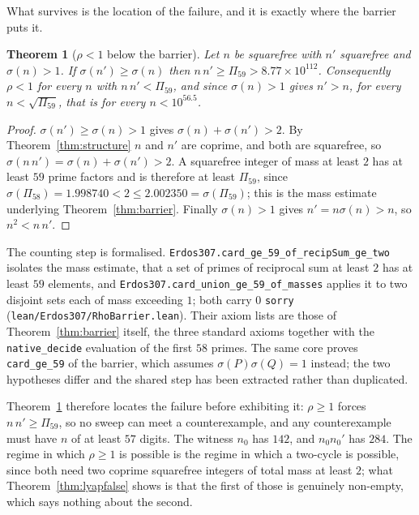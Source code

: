 \documentclass[11pt]{article}
\newtheorem{theorem}{Theorem}[section]
\theoremstyle{definition}
\begin{document}
What survives is the location of the failure, and it is exactly where the barrier puts it.

\begin{theorem}[$\rho<1$ below the barrier]\label{thm:rhobarrier}
Let $n$ be squarefree with $n'$ squarefree and $\sigma(n)>1$. If $\sigma(n')\ge\sigma(n)$ then
$n\,n'\ge\Pi_{59}>8.77\times10^{112}$. Consequently $\rho<1$ for every $n$ with
$n\,n'<\Pi_{59}$, and since $\sigma(n)>1$ gives $n'>n$, for every $n<\sqrt{\Pi_{59}}$, that is for
every $n<10^{56.5}$.
\end{theorem}
\begin{proof}
$\sigma(n')\ge\sigma(n)>1$ gives $\sigma(n)+\sigma(n')>2$. By Theorem~\ref{thm:structure} $n$ and
$n'$ are coprime, and both are squarefree, so $\sigma(n\,n')=\sigma(n)+\sigma(n')>2$. A squarefree
integer of mass at least $2$ has at least $59$ prime factors and is therefore at least $\Pi_{59}$,
since $\sigma(\Pi_{58})=1.998740<2\le2.002350=\sigma(\Pi_{59})$; this is the mass estimate
underlying Theorem~\ref{thm:barrier}. Finally $\sigma(n)>1$ gives $n'=n\sigma(n)>n$, so
$n^2<n\,n'$.
\end{proof}

The counting step is formalised. \texttt{Erdos307.card\_ge\_59\_of\_recipSum\_ge\_two} isolates the
mass estimate, that a set of primes of reciprocal sum at least $2$ has at least $59$ elements, and
\texttt{Erdos307.card\_union\_ge\_59\_of\_masses} applies it to two disjoint sets each of mass
exceeding $1$; both carry $0$ \texttt{sorry}
\textup{(\texttt{lean/Erdos307/RhoBarrier.lean})}. Their axiom lists are those of
Theorem~\ref{thm:barrier} itself, the three standard axioms together with the
\texttt{native\_decide} evaluation of the first $58$ primes. The same core proves
\texttt{card\_ge\_59} of the barrier, which assumes $\sigma(P)\sigma(Q)=1$ instead; the two
hypotheses differ and the shared step has been extracted rather than duplicated.

Theorem~\ref{thm:rhobarrier} therefore locates the failure before exhibiting it: $\rho\ge1$ forces
$n\,n'\ge\Pi_{59}$, so no sweep can meet a counterexample, and any counterexample must have $n$ of
at least $57$ digits. The witness $n_0$ has $142$, and $n_0n_0'$ has $284$. The regime in which
$\rho\ge1$ is possible is the regime in which a two-cycle is possible, since both need two coprime
squarefree integers of total mass at least $2$; what Theorem~\ref{thm:lyapfalse} shows is that the
first of those is genuinely non-empty, which says nothing about the second.
\end{document}
